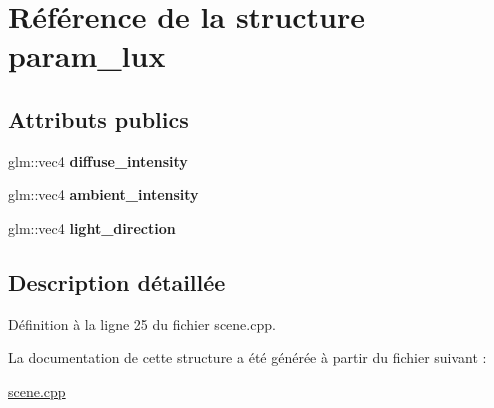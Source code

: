 \hypertarget{structparam__lux}{\section{Référence de la structure param\+\_\+lux}
\label{structparam__lux}
}
\subsection*{Attributs publics}
\begin{DoxyCompactItemize}
\item 
\hypertarget{structparam__lux_a18a60a5f3b290f21a1f9b81dbdc0275c}{glm\+::vec4 {\bfseries diffuse\+\_\+intensity}}\label{structparam__lux_a18a60a5f3b290f21a1f9b81dbdc0275c}

\item 
\hypertarget{structparam__lux_ab716533c7c60d7fe5b610ac81ac4855d}{glm\+::vec4 {\bfseries ambient\+\_\+intensity}}\label{structparam__lux_ab716533c7c60d7fe5b610ac81ac4855d}

\item 
\hypertarget{structparam__lux_a29d5fb59ee1d0b47c44777f23ff10809}{glm\+::vec4 {\bfseries light\+\_\+direction}}\label{structparam__lux_a29d5fb59ee1d0b47c44777f23ff10809}

\end{DoxyCompactItemize}


\subsection{Description détaillée}


Définition à la ligne 25 du fichier scene.\+cpp.



La documentation de cette structure a été générée à partir du fichier suivant \+:\begin{DoxyCompactItemize}
\item 
\hyperlink{scene_8cpp}{scene.\+cpp}\end{DoxyCompactItemize}
